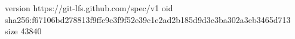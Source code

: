 version https://git-lfs.github.com/spec/v1
oid sha256:f67106bd278813f9ffc9c3f9f52e39c1e2ad2b185d9d3c3ba302a3eb3465d713
size 43840
